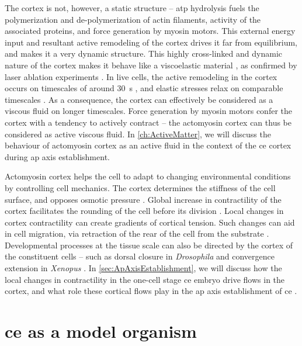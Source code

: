The cortex is not, however, a static structure -- \ac{atp} hydrolysis fuels the polymerization and de-polymerization of actin filaments, activity of the associated proteins, and force generation by myosin motors. This external energy input and resultant active remodeling of the cortex drives it far from equilibrium, and makes it a very dynamic structure. This highly cross-linked and dynamic nature of the cortex makes it behave like a viscoelastic material \citep{kumar2021actomyosin,salbreux2012actin}, as confirmed by laser ablation experiments \citep{saha2016determining,mayer2010anisotropies}. In live cells, the active remodeling in the cortex occurs on timescales of around \SI{30}{\second} \citep{fritzsche2016actin}, and elastic stresses relax on comparable timescales \citep{saha2016determining}. As a consequence, the cortex can effectively be considered as a viscous fluid on longer timescales. Force generation by myosin motors confer the cortex with a tendency to actively contract \citep{carlsson2006contractile} -- the actomyosin cortex can thus be considered as active viscous fluid. In \autoref{ch:ActiveMatter}, we will discuss the behaviour of actomyosin cortex as an active fluid in the context of the \ac{ce} cortex during \ac{ap} axis establishment.

Actomyosin cortex helps the cell to adapt to changing environmental conditions by controlling cell mechanics. The cortex determines the stiffness of the cell surface, and opposes osmotic pressure \citep{stewart2011hydrostatic}. Global increase in contractility of the cortex facilitates the rounding of the cell before its division \citep{kunda2008moesin}. Local changes in cortex contractility can create gradients of cortical tension. Such changes can aid in cell migration, via retraction of the rear of the cell from the substrate \citep{vicente2009non}. Developmental processes at the tissue scale can also be directed by the cortex of the constituent cells \citep{rauzi2011cortical} -- such as dorsal closure in \textit{Drosophila} \citep{martin2010pulsation} and convergence extension in \textit{Xenopus} \citep{zhou2009actomyosin}. In \autoref{sec:ApAxisEstablishment}, we will discuss how the local changes in contractility in the one-cell stage \ac{ce} embryo drive flows in the cortex, and what role these cortical flows play in the \ac{ap} axis establishment of \ac{ce} \citep{mayer2010anisotropies}.

\section{\acs{ce} as a model organism}\label{sec:CelegansModel}

